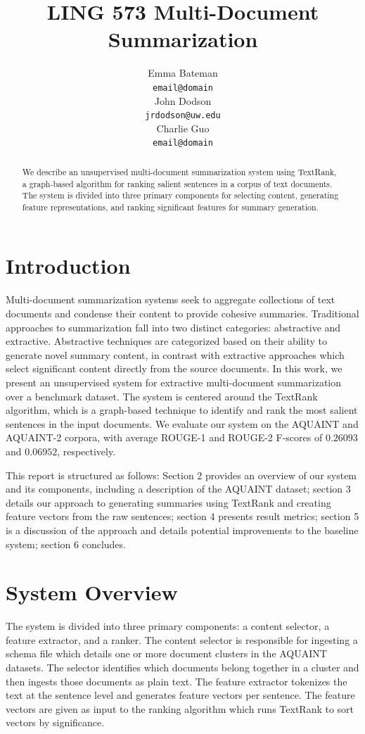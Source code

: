 \documentclass[11pt]{article}
\title{LING 573 Multi-Document Summarization}
\author{Emma Bateman \\
  {\tt email@domain} \\\And
  John Dodson \\
  {\tt jrdodson@uw.edu} \\\And
  Charlie Guo \\
  {\tt email@domain}
  }
\date{}
\begin{document}
\maketitle
\begin{abstract}
We describe an unsupervised multi-document summarization system using TextRank, a graph-based algorithm for ranking salient sentences in a corpus of text documents. The system is divided into three primary components for selecting content, generating feature representations, and ranking significant features for summary generation.
\end{abstract}

\section{Introduction}

Multi-document summarization systems seek to aggregate collections of text documents and condense their content to provide cohesive summaries. Traditional approaches to summarization fall into two distinct categories: abstractive and extractive. Abstractive techniques are categorized based on their ability to generate novel summary content, in contrast with extractive approaches which select significant content directly from the source documents. In this work, we present an unsupervised system for extractive multi-document summarization over a benchmark dataset. The system is centered around the TextRank algorithm, which is a graph-based technique to identify and rank the most salient sentences in the input documents. We evaluate our system on the AQUAINT and AQUAINT-2 corpora, with average ROUGE-1 and ROUGE-2 F-scores of $0.26093$ and $0.06952$, respectively. 

This report is structured as follows: Section 2 provides an overview of our system and its components, including a description of the AQUAINT dataset; section 3 details our approach to generating summaries using TextRank and creating feature vectors from the raw sentences; section 4 presents result metrics; section 5 is a discussion of the approach and details potential improvements to the baseline system; section 6 concludes.

\section{System Overview}
The system is divided into three primary components: a content selector, a feature extractor, and a ranker. The content selector is responsible for ingesting a schema file which details one or more document clusters in the AQUAINT datasets. The selector identifies which documents belong together in a cluster and then ingests those documents as plain text. The feature extractor tokenizes the text at the sentence level and generates feature vectors per sentence. The feature vectors are given as input to the ranking algorithm which runs TextRank to sort vectors by significance. 
\end{document}
